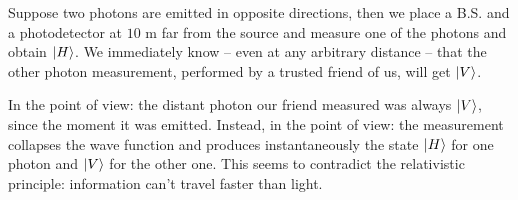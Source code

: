 Suppose two photons are emitted in opposite directions, then we place a B.S. and a photodetector at $10$ m far from the source and measure one of the photons and obtain $\ket{H}$. We immediately know -- even at any arbitrary distance -- that the other photon measurement, performed by a trusted friend of us, will get $\ket{V}$.

In the  point of view: the distant photon our friend measured was always $\ket{V}$, since the moment it was emitted. Instead, in the  point of view: the measurement collapses the wave function and produces instantaneously the state $\ket{H}$ for one photon and $\ket{V}$ for the other one. This seems to contradict the relativistic principle: information can't travel faster than light.


